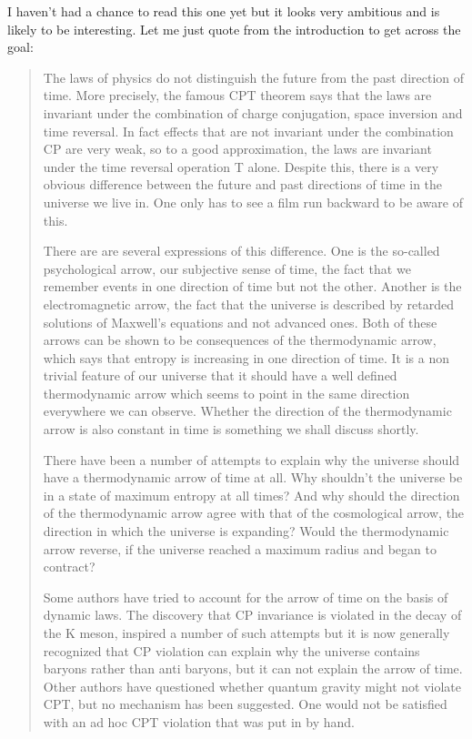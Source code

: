 I haven't had a chance to read this one yet but it looks very ambitious and is likely to be interesting. Let me just quote from the introduction to get across the goal:

\begin{quote}
The laws of physics do not distinguish the future from the past direction of time. More precisely, the famous CPT theorem says that the laws are invariant under the combination of charge conjugation, space inversion and time reversal. In fact effects that are not invariant under the combination CP are very weak, so to a good approximation, the laws are invariant under the time reversal operation T alone. Despite this, there is a very obvious difference between the future and past directions of time in the universe we live in. One only has to see a film run backward to be aware of this.

There are are several expressions of this difference. One is the so-called psychological arrow, our subjective sense of time, the fact that we remember events in one direction of time but not the other. Another is the electromagnetic arrow, the fact that the universe is described by retarded solutions of Maxwell's equations and not advanced ones. Both of these arrows can be shown to be consequences of the thermodynamic arrow, which says that entropy is increasing in one direction of time. It is a non trivial feature of our universe that it should have a well defined thermodynamic arrow which seems to point in the same direction everywhere we can observe. Whether the direction of the thermodynamic arrow is also constant in time is something we shall discuss shortly.

There have been a number of attempts to explain why the universe should have a thermodynamic arrow of time at all. Why shouldn't the universe be in a state of maximum entropy at all times? And why should the direction of the thermodynamic arrow agree with that of the cosmological arrow, the direction in which the universe is expanding? Would the thermodynamic arrow reverse, if the universe reached a maximum radius and began to contract?

Some authors have tried to account for the arrow of time on the basis of dynamic laws. The discovery that CP invariance is violated in the decay of the K meson, inspired a number of such attempts but it is now generally recognized that CP violation can explain why the universe contains baryons rather than anti baryons, but it can not explain the arrow of time. Other authors have questioned whether quantum gravity might not violate CPT, but no mechanism has been suggested. One would not be satisfied with an ad hoc CPT violation that was put in by hand.


\end{quote}
